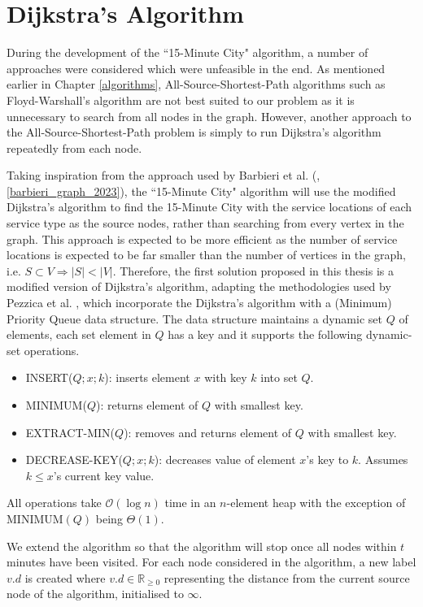 \section{Dijkstra's Algorithm}

During the development of the ``15-Minute City" algorithm, a number of approaches were considered which were unfeasible in the end. As mentioned earlier in Chapter \ref{algorithms}, All-Source-Shortest-Path algorithms such as Floyd-Warshall's algorithm are not best suited to our problem as it is unnecessary to search from all nodes in the graph. However, another approach to the All-Source-Shortest-Path problem is simply to run Dijkstra's algorithm repeatedly from each node.

Taking inspiration from the approach used by Barbieri et al. (\cite{barbieri_graph_2023}, \ref{barbieri_graph_2023}), the ``15-Minute City" algorithm will use the modified Dijkstra's algorithm to find the 15-Minute City with the service locations of each service type as the source nodes, rather than searching from every vertex in the graph. This approach is expected to be more efficient as the number of service locations is expected to be far smaller than the number of vertices in the graph, $\text{i.e. }S\subset V\Rightarrow|S|<|V|$. Therefore, the first solution proposed in this thesis is a modified version of Dijkstra's algorithm, adapting the methodologies used by Pezzica et al. \cite{cormen2022introduction}, which incorporate the Dijkstra's algorithm with a (Minimum) Priority Queue data structure. The data structure maintains a dynamic set $Q$ of elements, each set element in $Q$ has a key and it supports the following dynamic-set operations.

\begin{itemize}
    \item INSERT($Q; x; k$): inserts element $x$ with key $k$ into set $Q$.
    \item MINIMUM($Q$): returns element of $Q$ with smallest key.
    \item EXTRACT-MIN($Q$): removes and returns element of $Q$ with smallest key.
    \item DECREASE-KEY($Q;x;k$): decreases value of element $x$'s key to $k$. Assumes $k\leq x$'s current key value.
\end{itemize}

All operations take $\mathcal{O}(\log n)$ time in an $n$-element heap with the exception of $\text{MINIMUM}(Q)$ being $\Theta(1)$.

We extend the algorithm so that the algorithm will stop once all nodes within $t$ minutes have been visited. For each node considered in the algorithm, a new label $v.d$ is created where $v.d \in \mathbb{R}_{\geq 0}$ representing the distance from the current source node of the algorithm, initialised to $\infty$.

